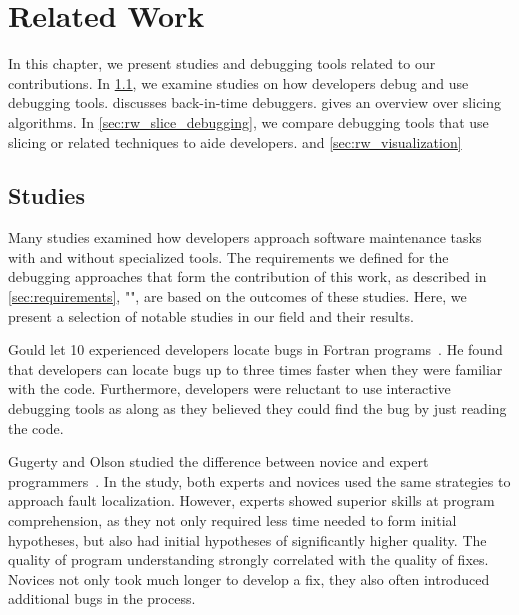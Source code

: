 
\chapter{Related Work}
\label{sec:relatedwork}

In this chapter, we present studies and debugging tools related to our contributions.
In \cref{sec:rw_studies}, we examine studies on how developers debug and use debugging tools.
 discusses back-in-time debuggers.
 gives an overview over slicing algorithms.
In \cref{sec:rw_slice_debugging}, we compare debugging tools that use slicing or related techniques to aide developers.
 and 
\cref{sec:rw_visualization}


\section{Studies}
\label{sec:rw_studies}

Many studies examined how developers approach software maintenance tasks with and without specialized tools.
The requirements we defined for the debugging approaches that form the contribution of this work, as described in \cref{sec:requirements}, "", are based on the outcomes of these studies.
Here, we present a selection of notable studies in our field and their results.

Gould let 10 experienced developers locate bugs in Fortran programs~\cite{gould75:some_psychological_evidence}.
He found that developers can locate bugs up to three times faster when they were familiar with the code.
Furthermore, developers were reluctant to use interactive debugging tools as along as they believed they could find the bug by just reading the code.

Gugerty and Olson studied the difference between novice and expert programmers~\cite{gugerty86:comprehension_differences_in_debugging}.
In the study, both experts and novices used the same strategies to approach fault localization.
However, experts showed superior skills at program comprehension, as they not only required less time needed to form initial hypotheses, but also had initial hypotheses of significantly higher quality.
The quality of program understanding strongly correlated with the quality of fixes.
Novices not only took much longer to develop a fix, they also often introduced additional bugs in the process.

